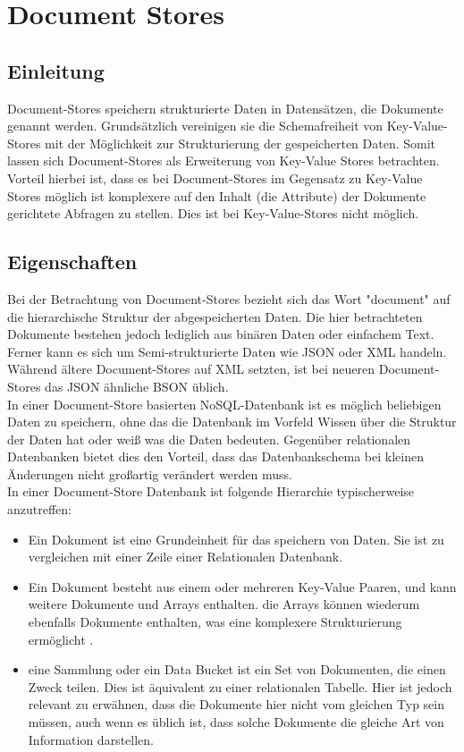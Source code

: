 \section{Document Stores}
\subsection{Einleitung}
Document-Stores speichern strukturierte Daten in Datensätzen, die Dokumente genannt werden. Grundsätzlich vereinigen sie die Schemafreiheit von Key-Value-Stores mit der Möglichkeit zur Strukturierung der gespeicherten Daten. Somit lassen sich Document-Stores als Erweiterung von Key-Value Stores betrachten. Vorteil hierbei ist, dass es bei Document-Stores im Gegensatz zu Key-Value Stores möglich ist komplexere auf den Inhalt (die Attribute) der Dokumente gerichtete Abfragen zu stellen. Dies ist bei Key-Value-Stores nicht möglich.

\subsection{Eigenschaften}
Bei der Betrachtung von Document-Stores bezieht sich das Wort "document" auf die hierarchische Struktur der abgespeicherten Daten. Die hier betrachteten Dokumente bestehen jedoch lediglich aus binären Daten oder einfachem Text. Ferner kann es sich um Semi-strukturierte Daten wie JSON oder XML handeln. Während ältere Document-Stores auf XML setzten, ist bei neueren Document-Stores das JSON ähnliche BSON üblich. 
\\

In einer Document-Store basierten NoSQL-Datenbank ist es möglich beliebigen Daten zu speichern, ohne das die Datenbank im Vorfeld Wissen über die Struktur der Daten hat oder weiß was die Daten bedeuten. Gegenüber relationalen Datenbanken bietet dies den Vorteil, dass das Datenbankschema bei kleinen Änderungen nicht großartig verändert werden muss. 
\\

In einer Document-Store Datenbank ist folgende Hierarchie typischerweise anzutreffen:
\begin{itemize}
\item Ein Dokument ist eine Grundeinheit für das speichern von Daten. Sie ist zu vergleichen mit einer Zeile einer Relationalen Datenbank.
\item Ein Dokument besteht aus einem oder mehreren Key-Value Paaren, und kann weitere Dokumente und Arrays enthalten. die Arrays können wiederum ebenfalls Dokumente enthalten, was eine komplexere Strukturierung ermöglicht \cite{GuyHarrison}.
\item eine Sammlung oder ein Data Bucket ist ein Set von Dokumenten, die einen Zweck teilen. Dies ist äquivalent zu einer relationalen Tabelle. Hier ist jedoch relevant zu erwähnen, dass die Dokumente hier nicht vom gleichen Typ sein müssen, auch wenn es üblich ist, dass solche Dokumente die gleiche Art von Information darstellen.
\end{itemize}

